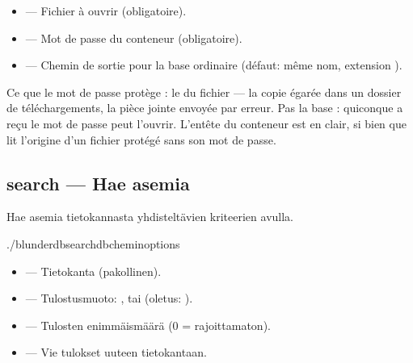 \documentclass[letterpaper,10pt,finnish]{sphinxmanual}
\begin{document}
\sphinxAtStartPar
{}
\begin{itemize}
\item {} 
\sphinxAtStartPar
{} — Fichier  à ouvrir (obligatoire).

\item {} 
\sphinxAtStartPar
{} — Mot de passe du conteneur (obligatoire).

\item {} 
\sphinxAtStartPar
{} — Chemin de sortie pour la base ordinaire (défaut: même nom,
extension ).

\end{itemize}

\sphinxAtStartPar
Ce que le mot de passe protège : le  du fichier — la copie égarée
dans un dossier de téléchargements, la pièce jointe envoyée par erreur. Pas la
base : quiconque a reçu le mot de passe peut l’ouvrir. L’en\sphinxhyphen{}tête du conteneur
est en clair, si bien que  lit l’origine d’un fichier
protégé sans son mot de passe.


\subsection{search — Hae asemia}
\label{\detokenize{cli:search-rechercher-des-positions}}
\sphinxAtStartPar
Hae asemia tietokannasta yhdisteltävien kriteerien avulla.

\begin{sphinxVerbatim}[commandchars=\\\{\}]
./blunderdbsearch\PYGZhy{}\PYGZhy{}db\PYGZlt{}chemin\PYGZgt{}\PYG{o}{[}options\PYG{o}{]}
\end{sphinxVerbatim}

\sphinxAtStartPar
{}
\begin{itemize}
\item {} 
\sphinxAtStartPar
{} — Tietokanta (pakollinen).

\item {} 
\sphinxAtStartPar
{} — Tulostusmuoto: ,  tai  (oletus: ).

\item {} 
\sphinxAtStartPar
{} — Tulosten enimmäismäärä (0 = rajoittamaton).

\item {} 
\sphinxAtStartPar
{} — Vie tulokset uuteen tietokantaan.

\end{itemize}
\end{document}
